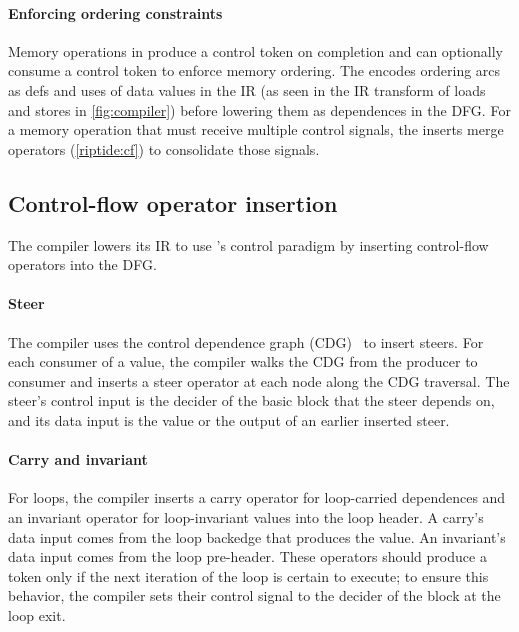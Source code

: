 \paragraph{Enforcing ordering constraints} Memory operations in \riptide 
produce a control token on completion and can optionally consume a
control token to enforce memory ordering.
%
The \mend encodes ordering arcs as defs and uses of data values in the IR
(as seen in the IR transform of loads and stores in \autoref{fig:compiler})
before lowering them as dependences in the DFG.
%
For a memory operation that must receive multiple control signals,
the \mend inserts merge operators (\autoref{riptide:cf}) to consolidate those signals.

\subsection{Control-flow operator insertion}

The compiler lowers its IR to use \riptide's control paradigm by inserting \riptide
control-flow operators into the DFG.
%

\paragraph{Steer}
%
The compiler uses the control dependence graph (CDG)~\cite{cytron} to 
insert steers.
%
For each consumer of a value, the compiler walks the CDG from the producer
to consumer
and inserts a steer operator at
each node along the CDG traversal. 
%
The steer's control input is the decider of the basic block that the steer depends on,
and its data input is the value or the output of an earlier inserted steer.
%

\paragraph{Carry and invariant}
%
For loops, the compiler inserts a carry operator for loop-carried dependences
and an invariant operator for loop-invariant values
into the loop header.
%
A carry's data
input comes from the loop backedge that produces the value.  An invariant's
data input comes from the loop pre-header.
%
These operators should produce a token only if the next iteration of the loop is
certain to execute; to ensure this behavior, the compiler sets their control
signal to the decider of the block at the loop exit. 
%

